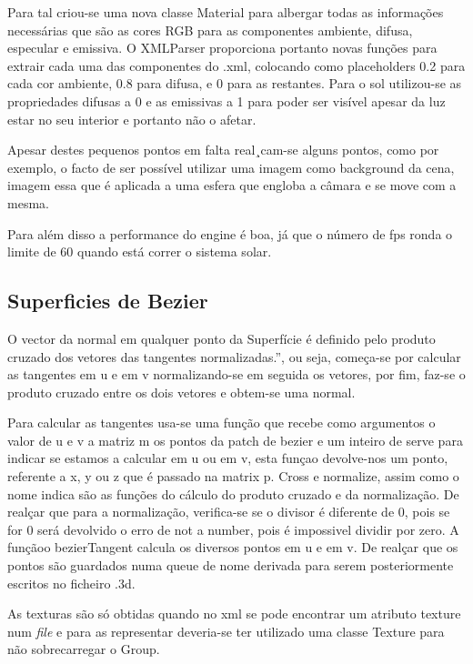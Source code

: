 Para tal criou-se uma nova classe Material para albergar todas as informações necessárias que são as cores RGB para as componentes ambiente, difusa, especular e emissiva.
O XMLParser proporciona portanto novas funções para extrair cada uma das componentes do .xml, colocando como placeholders 0.2 para cada cor ambiente, 0.8 para difusa, e 0 para as restantes. Para o sol utilizou-se as propriedades difusas a 0 e as emissivas a 1 para
poder ser visível apesar da luz estar no seu interior e portanto não o afetar.

Apesar destes pequenos pontos em falta real¸cam-se alguns pontos, como por exemplo, o facto de ser possível utilizar uma imagem como background da cena, imagem essa que é aplicada a uma esfera que engloba a câmara e se move com a mesma. 

Para além disso a performance do engine é boa, já que o número de fps ronda o limite de 60 quando está correr o sistema solar.


\subsection{Superficies de Bezier}

O vector da normal em qualquer ponto da Superfície é definido pelo produto cruzado dos vetores das tangentes normalizadas.”, ou seja, começa-se por calcular as tangentes em u e em v normalizando-se em seguida os vetores, por fim, faz-se o produto cruzado entre os dois vetores e obtem-se uma normal.


Para calcular as tangentes usa-se uma função que recebe como argumentos o valor de u e v a matriz m os pontos da patch de bezier e um inteiro de serve para indicar se estamos a calcular em u ou em v, esta funçao devolve-nos um ponto, referente a x, y ou z que é passado na matrix p.
Cross e normalize, assim como o nome indica são as funções do cálculo do produto cruzado e da normalização. De realçar que para a normalização, verifica-se se o divisor é diferente de 0, pois se for 0 será devolvido o erro de not a number, pois é impossivel dividir por zero.
A funçãoo bezierTangent calcula os diversos pontos em u e em v. De realçar que os pontos são guardados numa queue de nome derivada para serem posteriormente escritos no ficheiro .3d.


As texturas são só obtidas quando no xml se pode encontrar um atributo texture num \textit{file} e para as representar deveria-se ter utilizado uma classe Texture para não sobrecarregar o Group.